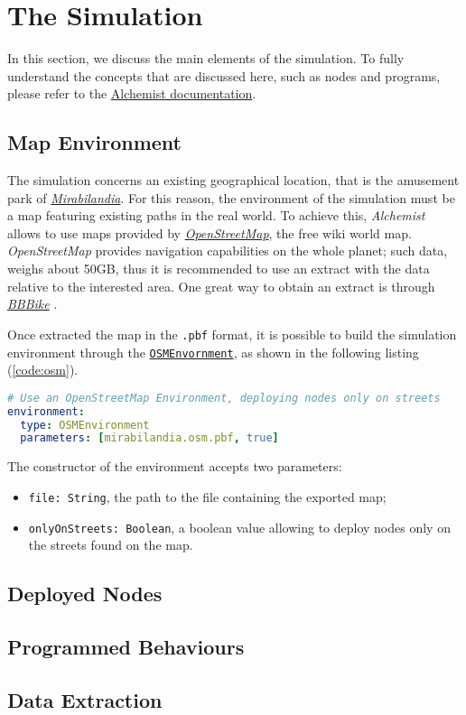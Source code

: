 \usepackage{hyperref}\section{The Simulation}

In this section, we discuss the main elements of the simulation. To fully understand the concepts that are discussed here, such as nodes and programs, please refer to the \href{https://alchemistsimulator.github.io/}{Alchemist documentation}.

\subsection{Map Environment}
The simulation concerns an existing geographical location, that is the amusement park of \href{https://www.mirabilandia.it/}{\textit{Mirabilandia}}. For this reason, the environment of the simulation must be a map featuring existing paths in the real world. To achieve this, \textit{Alchemist} allows to use maps provided by \href{https://www.openstreetmap.org/}{\textit{OpenStreetMap}}, the free wiki world map. \textit{OpenStreetMap} provides navigation capabilities on the whole planet; such data, weighs about 50GB, thus it is recommended to use an extract with the data relative to the interested area. One great way to obtain an extract is through \href{https://extract.bbbike.org/}{\textit{BBBike}} \cite{Pianini_2013}.

Once extracted the map in the \texttt{.pbf} format, it is possible to build the simulation environment through the \href{https://alchemistsimulator.github.io/reference/kdoc/alchemist/it.unibo.alchemist.model.implementations.environments/-o-s-m-environment/}{\texttt{OSMEnvornment}}, as shown in the following listing (\ref{code:osm}).

\begin{lstlisting}[language=yaml, label=code:osm, caption=Building an \textit{OpenStreetMap} environment.]
# Use an OpenStreetMap Environment, deploying nodes only on streets
environment:
  type: OSMEnvironment
  parameters: [mirabilandia.osm.pbf, true]
\end{lstlisting}

The constructor of the environment accepts two parameters:
\begin{itemize}
    \item \texttt{file: String}, the path to the file containing the exported map;
    \item \texttt{onlyOnStreets: Boolean}, a boolean value allowing to deploy nodes only on the streets found on the map.
\end{itemize}

\subsection{Deployed Nodes}

\subsection{Programmed Behaviours}

\subsection{Data Extraction}
